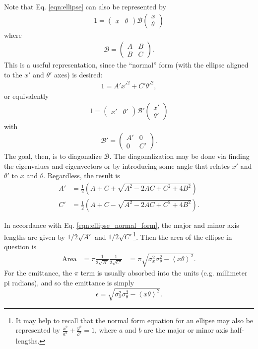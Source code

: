 Note that Eq. \eqref{eqn:ellipse} can also be represented by
\begin{align*}
1=\begin{pmatrix} x & \theta \end{pmatrix}	\mathcal{B} 	\begin{pmatrix} x\\ \theta \end{pmatrix}
\end{align*}
where
\begin{align*}
\mathcal{B}=
	\begin{pmatrix}
	A & B\\
	B & C
	\end{pmatrix}.
\end{align*}
This is a useful representation, since the ``normal'' form (with the ellipse aligned to the $x'$ and $\theta '$ axes) is desired:
\begin{align} \label{eqn:ellipse_normal_form}
1 = A'x'^2 + C'\theta '^2,
\end{align}
or equivalently
\begin{align*}
1 = \begin{pmatrix} x' & \theta ' \end{pmatrix}	\mathcal{B'} 	\begin{pmatrix} x'\\ \theta ' \end{pmatrix}
\end{align*}
with
\begin{align*}
\mathcal{B}'=\begin{pmatrix} A' & 0 \\ 0 & C' \end{pmatrix}.
\end{align*}
The goal, then, is to diagonalize $\mathcal{B}$. The diagonalization may be done via finding the eigenvalues and eigenvectors or by introducing some angle that relates $x'$ and $\theta '$ to $x$ and $\theta$. Regardless, the result is
\begin{align*}
A'&=\frac{1}{2}\left(A+C+\sqrt{A^2-2AC+C^2+4B^2}\right)\\
C'&=\frac{1}{2}\left(A+C-\sqrt{A^2-2AC+C^2+4B^2}\right).
\end{align*}

In accordance with Eq. \eqref{eqn:ellipse_normal_form}, the major and minor axis lengths are given by $1/2\sqrt{A'}$ and $1/2\sqrt{C'}$\footnote{It may help to recall that the normal form equation for an ellipse may also be represented by $\frac{x^2}{a^2}+\frac{y^2}{b^2}=1$, where $a$ and $b$ are the major or minor axis half-lengths.}. Then the area of the ellipse in question is
\begin{align*}
\text{Area}&=\pi\frac{1}{2\sqrt{A'}}\frac{1}{2\sqrt{C'}}
&=\pi\sqrt{\sigma_x^2\sigma_\theta^2 - \left<x\theta\right>^2}.
\end{align*}
For the emittance, the $\pi$ term is usually absorbed into the units (e.g. millimeter pi radians), and so the emittance is simply
\begin{equation}\label{emittance_appendix}
\epsilon=\sqrt{\sigma_x^2\sigma_\theta^2 - \left<x\theta\right>^2}.
\end{equation}


